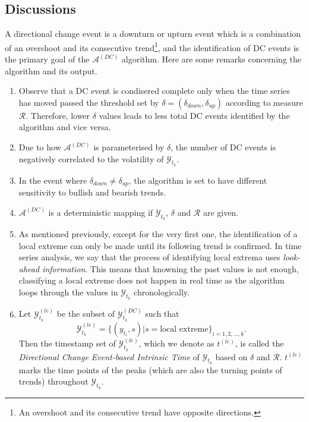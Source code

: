 \subsection{Discussions}\label{subsec: dc discussion}
A directional change event is a downturn or upturn event which is a combination of an overshoot and its consecutive trend\footnote{An overshoot and its consecutive trend have opposite directions.}, and the identification of DC events is the primary goal of the $\mathcal{A}^{(DC)}$ algorithm. Here are some remarks concerning the algorithm and its output.
\begin{enumerate}
    \item Observe that a DC event is condisered complete only when the time series has moved passed the threshold set by $\delta = (\delta_{down}, \delta_{up})$ according to measure $\mathcal{R}$. Therefore, lower $\delta$ values leads to less total DC events identified by the algorithm and vice versa.
    \item Due to how $\mathcal{A}^{(DC)}$ is parameterised by $\delta$, the number of DC events is negatively correlated to the volatility of $\mathcal{Y}_{t_k}$.
    \item In the event where $\delta_{down} \neq \delta_{up}$, the algorithm is set to have different sensitivity to bullish and bearish trends.
    \item $\mathcal{A}^{(DC)}$ is a deterministic mapping if $\mathcal{Y}_{t_k}$, $\delta$ and $\mathcal{R}$ are given.
    \item As mentioned previously, except for the very first one, the identification of a local extreme can only be made until its following trend is confirmed. In time series analysis, we say that the process of identifying local extrema uses \textit{look-ahead information}. This means that knowning the past values is not enough, classifying a local extreme does not happen in real time as the algorithm loops through the values in $\mathcal{Y}_{t_k}$ chronologically.
    \item Let $\mathcal{Y}^{(le)}_{t_k}$ be the subset of $\mathcal{Y}^{(DC)}_{t_k}$ such that
    \begin{equation*}
        \mathcal{Y}^{(le)}_{t_k} = \{ (y_{t_i}, s) | s = \text{local extreme} \}_{i = 1, 2, \ldots, k}.
    \end{equation*}
    Then the timestamp set of $\mathcal{Y}^{(le)}_{t_k}$, which we denote as $t^{(le)}$, is called the \textit{Directional Change Event-based Intrinsic Time} of $\mathcal{Y}_{t_k}$ based on $\delta$ and $\mathcal{R}$. $t^{(le)}$ marks the time points of the peaks (which are also the turning points of trends) throughout $\mathcal{Y}_{t_k}$.
\end{enumerate}
